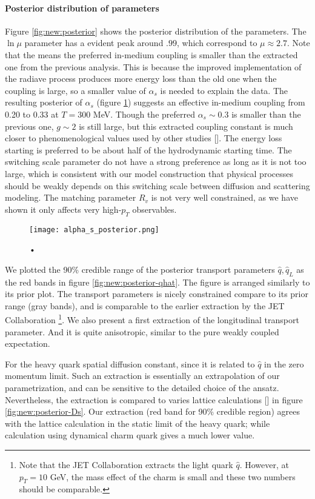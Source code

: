 \paragraph{Posterior distribution of parameters} Figure \ref{fig:new:posterior} shows the posterior distribution of the parameters.
The $\ln\mu$ parameter has a evident peak around $.99$, which correspond to $\mu \approx 2.7$.
Note that the means the preferred in-medium coupling is smaller than the extracted one from the previous analysis.
This is because the improved implementation of the radiave process produces more energy loss than the old one when the coupling is large, so a smaller value of $\alpha_s$ is needed to explain the data.
The resulting posterior of $\alpha_s$ (figure \ref{fig:new:posterior-alphas}) suggests an effective in-medium coupling from 0.20 to 0.33 at $T=300$ MeV.
Though the preferred $\alpha_s \sim 0.3$ is smaller than the previous one, $g\sim 2$ is still large, but this extracted coupling constant is much closer to phenomenological values used by other studies [].
The energy loss starting is preferred to be about half of the hydrodynamic starting time.
The switching scale parameter do not have a strong preference as long as it is not too large, which is consistent with our model construction that physical processes should be weakly depends on this switching scale between diffusion and scattering modeling.
The matching parameter $R_v$ is not very well constrained, as we have shown it only affects very high-$p_T$ observables.

\begin{figure}
\centering
\texttt{[image: alpha\_s\_posterior.png]}
\caption{•}
\label{fig:new:posterior-alphas}
\end{figure}

We plotted the 90\% credible range of the posterior transport parameters $\hat{q}, \hat{q}_L$ as the red bands in figure \ref{fig:new:posterior-qhat}.
The figure is arranged similarly to its prior plot.
The transport parameters is nicely constrained compare to its prior range (gray bands), and is comparable to the earlier extraction by the JET Collaboration \footnote{Note that the JET Collaboration extracts the light quark $\hat{q}$. However, at $p_T = 10$ GeV, the mass effect of the charm is small and these two numbers should be comparable.}.
We also present a first extraction of the longitudinal transport parameter. 
And it is quite anisotropic, similar to the pure weakly coupled expectation.

For the heavy quark spatial diffusion constant, since it is related to $\hat{q}$ in the zero momentum limit. 
Such an extraction is essentially an extrapolation of our parametrization, and can be sensitive to the detailed choice of the ansatz. 
Nevertheless, the extraction is compared to varies lattice calculations [] in  figure \ref{fig:new:posterior-Ds}.
Our extraction (red band for 90\% credible region) agrees with the lattice calculation in the static limit of the heavy quark; while calculation using dynamical charm quark gives a much lower value.


